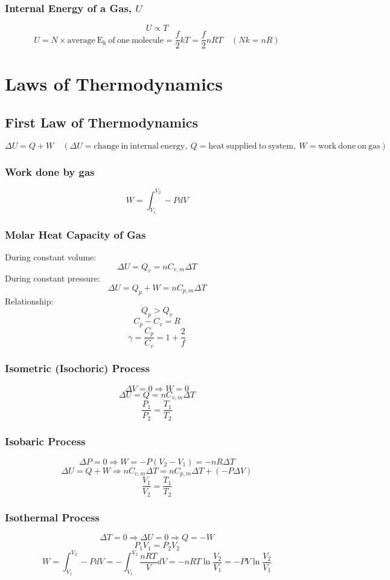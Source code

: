 \documentclass{article}
\begin{document}
\subsubsection*{Internal Energy of a Gas, \(U\)}
\[U\propto T\]
\[U = N\times\mathrm{average\ E_k\ of\ one\ molecule}=\frac{f}{2}kT=\frac{f}{2}nRT\quad(Nk=nR)\]

\section{Laws of Thermodynamics}
\subsection*{First Law of Thermodynamics}

\[\Delta U=Q+W\quad(\Delta U=\mathrm{change\ in\ internal\ energy},\ Q=\mathrm{heat\ supplied\ to\ system},\ W=\mathrm{work\ done\ on\ gas})\]
\subsubsection*{Work done by gas}
\[W=\int_{V_1}^{V_2}-PdV\]

\subsubsection*{Molar Heat Capacity of Gas}
During constant volume:
\[\Delta U=Q_v=nC_{v,m}\Delta T\]
During constant pressure:
\[\Delta U=Q_p+W=nC_{p,m}\Delta T\]
Relationship:
\[Q_p>Q_v\]
\[C_p-C_v=R\]
\[\gamma=\frac{C_p}{C_v}=1+\frac{2}{f}\]

\subsubsection*{Isometric (Isochoric) Process}
\[\Delta V=0 \Rightarrow W=0\]
\[\Delta U=Q=nC_{v,m}\Delta T\]
\[\frac{P_1}{P_2}=\frac{T_1}{T_2}\]

\subsubsection*{Isobaric Process}
\[\Delta P=0 \Rightarrow W=-P(V_2-V_1)=-nR\Delta T\]
\[\Delta U=Q+W\Rightarrow nC_{v,m}\Delta T=nC_{p,m}\Delta T+(-P\Delta V)\]
\[\frac{V_1}{V_2}=\frac{T_1}{T_2}\]

\subsubsection*{Isothermal Process}
\[\Delta T=0 \Rightarrow \Delta U=0 \Rightarrow Q=-W\]
\[P_1V_1=P_2V_2\]
\[W=\int_{V_1}^{V_2}-PdV=-\int_{V_1}^{V_2}\frac{nRT}{V}dV=-nRT\ln\frac{V_2}{V_1}=-PV\ln\frac{V_2}{V_1}\]
\end{document}
